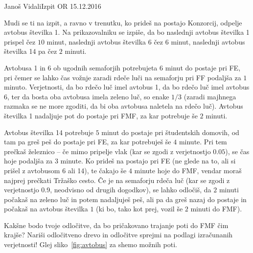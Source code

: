 \begin{naloga}{Janoš Vidali}{Izpit OR 15.12.2016}
\begin{vprasanje}
Mudi se ti na izpit, a ravno v trenutku,
ko prideš na postajo Konzorcij, odpelje avtobus številka 1.
Na prikazovalniku se izpiše,
da bo naslednji avtobus številka 1 prispel čez $10$ minut,
naslednji avtobus številka 6 čez $6$ minut,
naslednji avtobus številka 14 pa čez $2$ minuti.

Avtobusa 1 in 6 ob ugodnih semaforjih potrebujeta $6$ minut do postaje pri FE,
pri čemer se lahko čas vož\-nje zaradi rdeče luči na semaforju pri FF
podaljša za $1$ minuto.
Verjetnosti, da bo rdečo luč imel avtobus 1, da bo rdečo luč imel avtobus 6,
ter da bosta oba avtobusa imela zeleno luč, so enake $1/3$
(zaradi majhnega razmaka se ne more zgoditi,
da bi oba avtobusa naletela na rdečo luč).
Avtobus številka 1 nadaljuje pot do postaje pri FMF,
za kar potrebuje še $2$ minuti.

Avtobus številka 14 potrebuje $5$ minut do postaje pri študentskih domovih,
od tam pa greš peš do postaje pri FE, za kar potrebuješ še $4$ minute.
Pri tem prečkaš že\-lez\-ni\-co -- če mimo pripelje vlak
(kar se zgodi z verjetnostjo $0.05$),
se čas hoje podaljša za $3$ minute.
Ko prideš na postajo pri FE
(ne glede na to, ali si prišel z avtobusom 6 ali 14),
te čakajo še $4$ minute hoje do FMF,
vendar moraš najprej prečkati Tržaško cesto.
Če je na semaforju rdeča luč
(kar se zgodi z verjetnostjo 0.9, neodvisno od drugih dogodkov),
se lahko odločiš, da $2$ minuti počakaš na zeleno luč in potem nadaljuješ peš,
ali pa da greš nazaj do postaje in počakaš na avtobus številka $1$
(ki bo, tako kot prej, vozil še $2$ minuti do FMF).

Kakšne bodo tvoje odločitve,
da bo pričakovano trajanje poti do FMF čim krajše?
Nariši od\-lo\-čit\-ve\-no drevo
in odločitve sprejmi na podlagi izračunanih verjetnosti!
Glej sliko~\ref{fig:avtobus} za shemo možnih poti.

\begin{figure}[t]
\centering
{}
\end{figure}
\end{vprasanje}
\end{naloga}
